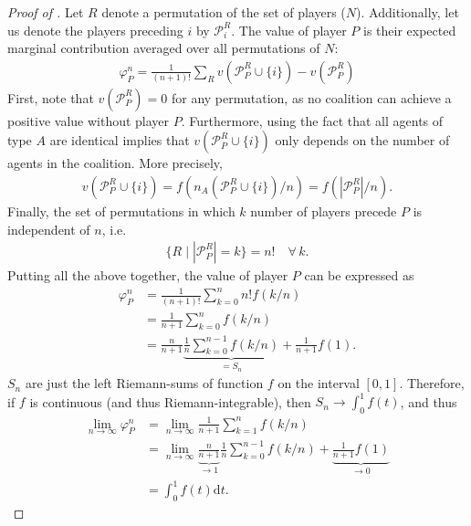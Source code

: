 \documentclass[a4paper]{article}
\newcommand{\dt}{\mathrm{d}t}
\begin{document}
\begin{proof}[Proof of ]
    Let $R$ denote a permutation of the set of players ($N$).
    Additionally, let us denote the players preceding $i$ by $\mathcal{P}_i^R$.
    The value of player $P$ is their expected marginal contribution averaged over all permutations of $N$:
    \begin{align*}
        \varphi_P^n = \frac{1}{(n+1)!} \sum_R v(\mathcal{P}_P^R \cup \{i\}) - v(\mathcal{P}_P^R)
    \end{align*}
    First, note that $v(\mathcal{P}_P^R) = 0$ for any permutation, as no coalition can achieve a positive value without player $P$.
    Furthermore, using the fact that all agents of type $A$ are identical implies that $v(\mathcal{P}_P^R \cup \{i\})$ only depends on the number of agents in the coalition.
    More precisely, 
    \begin{align*}
        v(\mathcal{P}_P^R \cup \{i\}) = f(n_A(\mathcal{P}_P^R \cup \{i\}) / n) = f(|\mathcal{P}_P^R| / n).
    \end{align*}
    Finally, the set of permutations in which $k$ number of players precede $P$ is independent of $n$, i.e.
    \begin{align*}
        \{R \mid |\mathcal{P}_P^R| = k\} = n! \quad \forall\, k.
    \end{align*}
    Putting all the above together, the value of player $P$ can be expressed as
    \begin{align*}
        \varphi_P^n &= \frac{1}{(n+1)!} \sum_{k=0}^n n! f(k / n) \\
        &= \frac{1}{n+1} \sum_{k=0}^n f(k / n) \\
        &= \frac{n}{n+1} \underbrace{\frac{1}{n} \sum_{k=0}^{n-1} f(k / n)}_{=S_n} + \frac{1}{n+1} f(1).
    \end{align*}
    $S_n$ are just the left Riemann-sums of function $f$ on the interval $[0, 1]$.
    Therefore, if $f$ is continuous (and thus Riemann-integrable), then $S_n \to \int_0^1 f(t)$, and thus
    \begin{align*}
        \lim_{n \to \infty} \varphi_P^n &= \lim_{n \to \infty} \frac{1}{n+1} \sum_{k=1}^n f(k / n) \\
        &= \lim_{n \to \infty}\underbrace{\frac{n}{n+1}}_{\to 1} \frac{1}{n} \sum_{k=0}^{n-1} f(k / n) + \underbrace{\frac{1}{n+1} f(1)}_{\to 0} \\
        &= \int_0^1 f(t) \dt .
    \end{align*}
\end{proof}
\end{document}
